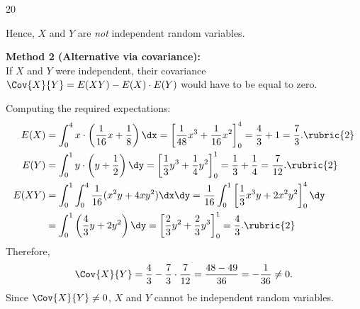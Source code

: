 \begin{enquestion}{20}
{        Hence, $X$ and $Y$ are \emph{not} independent random variables. 

        \vspace{0.5em}
        \textbf{Method 2 (Alternative via covariance):} \\
        If $X$ and $Y$ were independent, their covariance $\Cov{X}{Y} = E(XY) - E(X)\cdot E(Y)$ would have to be equal to zero. 
        
        Computing the required expectations:
        \begin{align*}
            E(X) &= \int_{0}^{4} x \cdot \left(\frac{1}{16}x + \frac{1}{8}\right) \dx = \left[\frac{1}{48}x^3 + \frac{1}{16}x^2\right]_{0}^{4} = \frac{4}{3} + 1 = \frac{7}{3}. \rubric{2} \\
            E(Y) &= \int_{0}^{1} y \cdot \left(y + \frac{1}{2}\right) \dy = \left[\frac{1}{3}y^3 + \frac{1}{4}y^2\right]_{0}^{1} = \frac{1}{3} + \frac{1}{4} = \frac{7}{12}. \rubric{2} \\
            E(XY) &= \int_{0}^{1} \int_{0}^{4} \frac{1}{16}(x^2y + 4xy^2)\dx\dy = \frac{1}{16} \int_0^1 \left[\frac{1}{3}x^3y + 2x^2y^2\right]_{0}^{4} \dy \\
                  &= \int_0^1 \left(\frac{4}{3}y + 2y^2\right) \dy = \left[\frac{2}{3}y^2 + \frac{2}{3}y^3\right]_0^1 = \frac{4}{3}. \rubric{2}
        \end{align*}
        Therefore,
        \[
            \Cov{X}{Y} = \frac{4}{3} - \frac{7}{3} \cdot \frac{7}{12} = \frac{48 - 49}{36} = -\frac{1}{36} \neq 0.
        \]
        Since $\Cov{X}{Y} \neq 0$, $X$ and $Y$ cannot be independent random variables. 
    }
\end{enquestion}